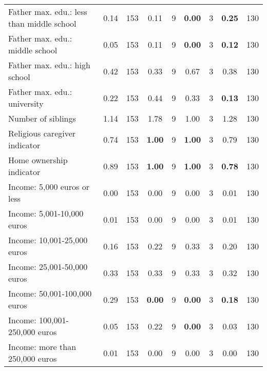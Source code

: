 \begin{tabular}{l c c c c c c c c}
Father max. edu.: less than middle school &      0.14 &       153 &      0.11 &         9 & \textbf{     0.00} &         3 & \textbf{     0.25} &       130 \\
Father max. edu.: middle school &      0.05 &       153 &      0.11 &         9 & \textbf{     0.00} &         3 & \textbf{     0.12} &       130 \\
Father max. edu.: high school &      0.42 &       153 &      0.33 &         9 &      0.67 &         3 &      0.38 &       130 \\
Father max. edu.: university &      0.22 &       153 &      0.44 &         9 &      0.33 &         3 & \textbf{     0.13} &       130 \\
Number of siblings &      1.14 &       153 &      1.78 &         9 &      1.00 &         3 &      1.28 &       130 \\
Religious caregiver indicator &      0.74 &       153 & \textbf{     1.00} &         9 & \textbf{     1.00} &         3 &      0.79 &       130 \\
Home ownership indicator &      0.89 &       153 & \textbf{     1.00} &         9 & \textbf{     1.00} &         3 & \textbf{     0.78} &       130 \\
Income: 5,000 euros or less &      0.00 &       153 &      0.00 &         9 &      0.00 &         3 &      0.01 &       130 \\
Income: 5,001-10,000 euros &      0.01 &       153 &      0.00 &         9 &      0.00 &         3 &      0.01 &       130 \\
Income: 10,001-25,000 euros &      0.16 &       153 &      0.22 &         9 &      0.33 &         3 &      0.20 &       130 \\
Income: 25,001-50,000 euros &      0.33 &       153 &      0.33 &         9 &      0.33 &         3 &      0.32 &       130 \\
Income: 50,001-100,000 euros &      0.29 &       153 & \textbf{     0.00} &         9 & \textbf{     0.00} &         3 & \textbf{     0.18} &       130 \\
Income: 100,001-250,000 euros &      0.05 &       153 &      0.22 &         9 & \textbf{     0.00} &         3 &      0.03 &       130 \\
Income: more than 250,000 euros &      0.01 &       153 &      0.00 &         9 &      0.00 &         3 &      0.00 &       130 \\
\bottomrule
\end{tabular}
